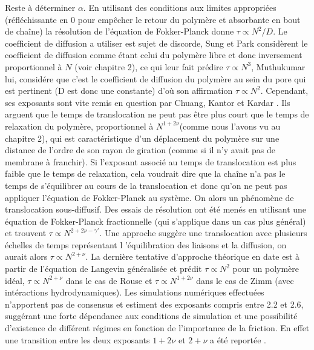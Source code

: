 \documentclass[a4paper,11pt]{article}
\begin{document}
 Reste à déterminer $\alpha$. En utilisant des conditions aux limites appropriées (réfléchissante en 0 pour empêcher le retour du polymère et absorbante en bout de chaîne) la résolution de l'équation de Fokker-Planck donne $\tau \propto N^{2}/D$. Le coefficient de diffusion a utiliser est sujet de discorde, Sung et Park \cite{Sung1996} considèrent le coefficient de diffusion comme étant celui du polymère libre et donc inversement proportionnel à $N$ (voir chapitre 2), ce qui leur fait prédire $\tau \propto N^{3}$, Muthukumar \cite{Muthukumar1999} lui, considére que c'est le coefficient de diffusion du polymère au sein du pore qui est pertinent (D est donc une constante) d'où son affirmation $\tau \propto N^{2}$. Cependant, ses exposants sont vite remis en question par Chuang, Kantor et Kardar \cite{Chuang2001}. Ils arguent que le temps de translocation ne peut pas être plus court que le temps de relaxation du polymère, proportionnel à $N^{1+2\nu}$(comme nous l'avons vu au chapitre 2), qui est caractéristique d'un déplacement du polymère sur une distance de l'ordre de son rayon de giration (comme si il n'y avait pas de membrane à franchir). Si l'exposant associé au temps de translocation est plus faible que le temps de relaxation, cela voudrait dire que la chaîne n'a pas le temps de s'équilibrer au cours de la translocation et donc qu'on ne peut pas appliquer l'équation de Fokker-Planck au système. On alors un phénomène de translocation sous-diffusif. Des essais de résolution ont été menés en utilisant une équation de Fokker-Planck fractionnelle \cite{Metzler2003} (qui s'applique dans un cas plus général) et trouvent $\tau \propto N^{2+2\nu-\gamma'}$. Une approche suggère une translocation avec plusieurs échelles de temps représentant l 'équilibration des liaisons et la diffusion, on aurait alors $\tau \propto N^{2+\nu}$. La dernière tentative d'approche théorique en date est à partir de l'équation de Langevin généralisée \cite{Panja2010} et prédit $\tau \propto N^2$ pour un polymère idéal, $\tau \propto N^{2+\nu}$ dans le cas de Rouse et $\tau \propto N^{1+2\nu}$ dans le cas de Zimm (avec intéractions hydrodynamiques). Les simulations numériques effectuées n'apportent pas de consensus et estiment des exposants compris entre 2.2 et 2.6, suggérant une forte dépendance aux conditions de simulation et une possibilité d'existence de différent régimes en fonction de l'importance de la friction. En effet une transition entre les deux exposants $1+2\nu$ et $2+\nu$ a été reportée \cite{Panja22010}.\\
\end{document}
